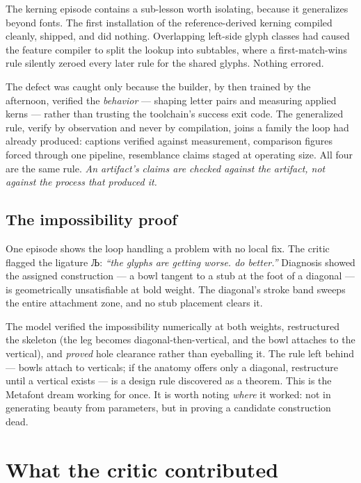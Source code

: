 \documentclass[11pt]{article}
\newcommand{\cz}[1]{{\chu #1}}
\begin{document}
The kerning episode contains a sub-lesson worth isolating, because it generalizes beyond fonts. The first installation of the reference-derived kerning compiled cleanly, shipped, and did nothing. Overlapping left-side glyph classes had caused the feature compiler to split the lookup into subtables, where a first-match-wins rule silently zeroed every later rule for the shared glyphs. Nothing errored.

The defect was caught only because the builder, by then trained by the afternoon, verified the \emph{behavior} — shaping letter pairs and measuring applied kerns — rather than trusting the toolchain's success exit code. The generalized rule, verify by observation and never by compilation, joins a family the loop had already produced: captions verified against measurement, comparison figures forced through one pipeline, resemblance claims staged at operating size. All four are the same rule. \emph{An artifact's claims are checked against the artifact, not against the process that produced it.}

\subsection{The impossibility proof}

One episode shows the loop handling a problem with no local fix. The critic flagged the ligature \cz{Љ}: \emph{``the glyphs are getting worse. do better.''} Diagnosis showed the assigned construction — a bowl tangent to a stub at the foot of a diagonal — is geometrically unsatisfiable at bold weight. The diagonal's stroke band sweeps the entire attachment zone, and no stub placement clears it.

The model verified the impossibility numerically at both weights, restructured the skeleton (the leg becomes diagonal-then-vertical, and the bowl attaches to the vertical), and \emph{proved} hole clearance rather than eyeballing it. The rule left behind — bowls attach to verticals; if the anatomy offers only a diagonal, restructure until a vertical exists — is a design rule discovered as a theorem. This is the Metafont dream working for once. It is worth noting \emph{where} it worked: not in generating beauty from parameters, but in proving a candidate construction dead.

\section{What the critic contributed}\label{sec:critic}
\end{document}

